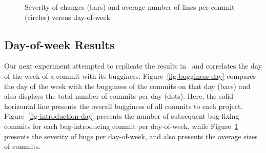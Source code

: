 \begin{figure}[tbh]
\centering
{}
\caption{\label{fig-severity-day}Severity of changes (bars) and average number of lines per commit (circles) versus day-of-week}
\end{figure}







\subsection{Day-of-week Results}
\label{sec-day-of-week}
Our next experiment attempted to replicate the results
in~\cite{sliwerski-msr-2005} and correlates the day of the week
of a commit with its bugginess. Figure~\ref{fig-bugginess-day} 
compares the day of the week
with the bugginess of the commits on that day (bars) and also displays
the total number of commits per day (dots). Here, the solid
horizontal line presents the overall bugginess of all commits to
each project. 
Figure~\ref{fig-introduction-day} presents the number of subsequent bug-fixing commits for each bug-introducing commit per day-of-week, while
Figure~\ref{fig-severity-day} 
presents the severity of bugs per day-of-week, and also presents the average
sizes of commits.

